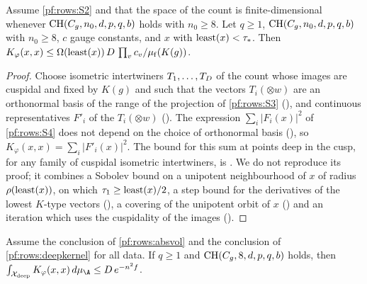 \begin{lemma}\label{pf:rows:deepkernel}
Assume \ref{pf:rows:S2} and that the space of the count is finite-dimensional whenever $\mathrm{CH}(C_g,n_0,d,p,q,b)$
holds with $n_0\ge8$. Let $q\ge1$, $\mathrm{CH}(C_g,n_0,d,p,q,b)$ with $n_0\ge8$, $c$ gauge constants, and $x$ with
$\operatorname{least}(x)<\tau_*$. Then
$K_\varphi(x,x)\le\Omega(\operatorname{least}(x))\,D\,\prod_vc_v/\mu_{\mathrm f}(K(g))$.
\end{lemma}

\begin{proof}
Choose isometric intertwiners $T_1,\dots,T_{D}$ of the count whose images are cuspidal and fixed by $K(g)$ and such
that the vectors $T_i(\otimes w)$ are an orthonormal basis of the range of the projection of \ref{pf:rows:S3}
(), and continuous representatives $F'_i$
of the $T_i(\otimes w)$ (). The expression
$\sum_i|F_i(x)|^2$ of \ref{pf:rows:S4} does not depend on the choice of orthonormal basis
(), so $K_\varphi(x,x)=\sum_i|F'_i(x)|^2$. The bound for this sum at points
deep in the cusp, for any family of cuspidal isometric intertwiners, is
. We do not reproduce its proof; it combines a
Sobolev bound on a unipotent neighbourhood of $x$ of radius $\rho(\operatorname{least}(x))$, on which $\tau_1\ge\operatorname{least}(x)/2$, a
step bound for the derivatives of the lowest $K$-type vectors
(), a covering of the unipotent orbit of $x$
() and an iteration which uses the cuspidality of the images
().
\end{proof}

\begin{lemma}\label{pf:rows:deep}
Assume the conclusion of \cref{pf:rows:absvol} and the conclusion of \cref{pf:rows:deepkernel} for all data. If $q\ge1$ and
$\mathrm{CH}(C_g,8,d,p,q,b)$ holds, then $\int_{\rowsdeep}K_\varphi(x,x)\,d\mu_{\A}\le\rowsDc\,e^{-n^2f}$.
\end{lemma}

